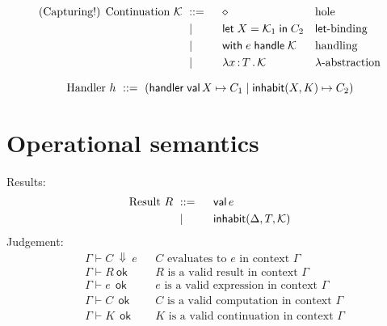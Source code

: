 \documentclass{article}
\newcommand{\bnf}{\ \mathrel{{:}{:}{=}}\ }
\newcommand{\bnfor}{\ \mid\ \ }
\newcommand{\x}{x}     %
\newcommand{\C}{C}     %
\newcommand{\K}{K}     %
\newcommand{\X}{X}     %
\newcommand{\e}{e}     %
\newcommand{\rgn}{r}   %
\newcommand{\h}{h}     %
\newcommand{\T}{T}     %
\newcommand{\val}{\mathsf{val}\,} %
\newcommand{\letin}[1]{\mathsf{let}\; #1 \;\mathsf{in}\;} %
\newcommand{\inhabitPat}[2]{\mathsf{inhabit}(#1, #2)} %
\newcommand{\inhabit}[3]{\mathsf{inhabit}(#1, #2, #3)} %
\newcommand{\withhandle}[1]{\mathsf{with}\;#1\;\mathsf{handle}\;} %
\newcommand{\abs}[1]{\mathsf{abs}\;#1\;\mathsf{in}\;} %
\newcommand{\lam}[2]{\lambda #1 \,{:}\, #2 \,.\,} %
\newcommand{\handler}[5]{\mathsf{handler}\; \val #1 \mapsto #2 \mid \inhabitPat{#3}{#4} \mapsto #5}
\newcommand{\cont}{{\cal K}}     %
\newcommand{\hole}{\diamond}
\newcommand{\G}{\Gamma}
\newcommand{\D}{\Delta}
\newcommand{\evalto}[3][\G]{#1 \vdash #2 \ \Downarrow\  #3}
\newcommand{\resultok}[2][\G]{#1 \vdash #2 \ \mathsf{ok}}
\newcommand{\eok}[2][\G]{#1 \vdash #2 \ \ \mathsf{ok}}
\newcommand{\cok}[2][\G]{#1 \vdash #2 \ \ \mathsf{ok}}
\newcommand{\kok}[2][\G]{#1 \vdash #2 \ \ \mathsf{ok}}
\newcommand{\typicalhandler}{\handler{\X}{\C_1}{\X}{\K}{\C_2}}
\begin{document}
%
\begin{equation*}
  \text{(Capturing!) Continuation $\cont$}
  \begin{aligned}[t]
    &\bnf   {} && \hole                && \text{hole} \\
    &\bnfor {} && \letin{\X = \cont_1} \C_2  && \text{$\mathsf{let}$-binding} \\
    &\bnfor {} && \withhandle{\e} \cont && \text{handling} \\
    &\bnfor {} && \lam{\x}{\T} \cont   && \text{$\lambda$-abstraction} \\
  \end{aligned}
\end{equation*}

%
\begin{equation*}
  \text{Handler $\h$}
  \bnf (\typicalhandler)\\
\end{equation*}



\section{Operational semantics}
\label{sec:oper-semant}

Results:
%
\begin{equation*}
  \text{Result $R$}
  \begin{aligned}[t]
    &\bnf   {} && \val \e \\
    &\bnfor {} && \inhabit{\D}{\T}{\cont} \\
  \end{aligned}
\end{equation*}
%
Judgement:
%
\begin{align*}
  &\evalto[\G]{C}{e} &&\text{$C$ evaluates to $e$ in context $\G$} \\
  &\resultok[\G]{R}  &&\text{$R$ is a valid result in context $\G$} \\
  &\eok[\G]{\e} &&\text{$\e$ is a valid expression in context $\G$} \\
  &\cok[\G]{\C} &&\text{$\C$ is a valid computation in context $\G$} \\
  &\kok[\G]{\K} &&\text{$\K$ is a valid continuation in context $\G$} \\
\end{align*}
%
\end{document}

